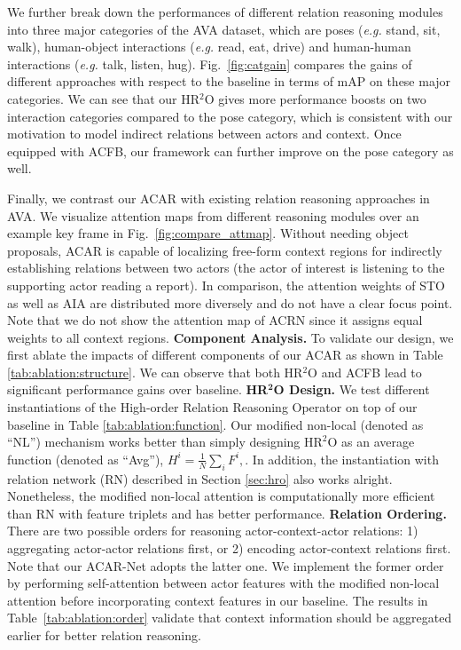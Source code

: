 We further break down the performances of different relation reasoning modules into three major categories of the AVA dataset, which are poses (\textit{e.g.} stand, sit, walk), human-object interactions (\textit{e.g.} read, eat, drive) and human-human interactions (\textit{e.g.} talk, listen, hug). Fig.~\ref{fig:catgain} compares the gains of different approaches with respect to the baseline in terms of mAP on these major categories. We can see that our HR$^2$O gives more performance boosts 
on two interaction categories compared to the pose category, which is consistent with our motivation to model indirect relations between actors and context. Once equipped with ACFB, our framework can further improve on the pose category as well.

Finally, we contrast our ACAR with existing relation reasoning approaches in AVA. We visualize attention maps from different reasoning modules over an example key frame in Fig.~\ref{fig:compare_attmap}. Without needing object proposals, ACAR is capable of localizing free-form context regions for indirectly establishing relations between two actors (the actor of interest is listening to the supporting actor reading a report). In comparison, the attention weights of STO as well as AIA are distributed more diversely and do not have a clear focus point. Note that we do not show the attention map of ACRN since it assigns equal weights to all context regions. 
{\flushleft \bf Component Analysis.} To validate our design, we first ablate the impacts of different components of our ACAR as shown in Table \ref{tab:ablation:structure}. We can observe that both HR$^2$O and ACFB lead to significant performance gains over baseline. 
{\flushleft \bf HR$^\mathbf{2}$O Design.} We test different instantiations of the High-order Relation Reasoning Operator on top of our baseline in Table \ref{tab:ablation:function}. 
Our modified non-local (denoted as ``NL'') mechanism works better than simply designing $\text{HR}^2\text{O}$ as an average function (denoted as ``Avg''), \ie $H^i = \frac{1}{N} \sum_{i} F^i,$. In addition, the instantiation with relation network (RN) described in Section \ref{sec:hro} also works 
alright. Nonetheless, the modified non-local attention is computationally more efficient than RN with feature triplets and has better performance.
{\flushleft \bf Relation Ordering.} There are two possible orders for reasoning actor-context-actor relations: 1) aggregating actor-actor relations first, or 2) encoding actor-context relations first. Note that our ACAR-Net adopts the latter one. We implement the former order by performing self-attention between actor features with the modified non-local attention before incorporating context features in our baseline. The results in Table~\ref{tab:ablation:order} validate that context information should be aggregated earlier for better relation reasoning.
